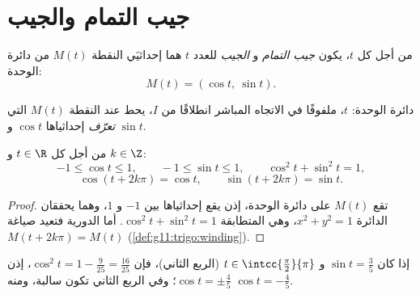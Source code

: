 \section{جيب التمام والجيب}

\begin{definition}\label{def:g11:trigo:cossin}
من أجل كل  $t$، يكون \emph{جيب التمام} و
\emph{الجيب} للعدد $t$ هما إحداثيَي النقطة $M(t)$ من
دائرة الوحدة:
\[
M(t) = (\cos t,\ \sin t).
\]
\end{definition}

\begin{omfigure}

{\small دائرة الوحدة:  $t$، ملفوفًا في الاتجاه المباشر انطلاقًا من
$I$، يحط عند النقطة $M(t)$ التي \emph{تعرّف} إحداثياها $\cos t$
و $\sin t$.}
\end{omfigure}

\begin{proposition}\label{prop:g11:trigo:first}
من أجل كل $t \in \R$ و $k \in \Z$:
\[
-1 \leq \cos t \leq 1, \qquad
-1 \leq \sin t \leq 1, \qquad
\cos^2 t + \sin^2 t = 1,
\]
\[
\cos(t + 2k\pi) = \cos t, \qquad \sin(t + 2k\pi) = \sin t .
\]
\end{proposition}

\begin{proof}
تقع $M(t)$ على دائرة الوحدة، إذن يقع إحداثياها بين $-1$ و
$1$، وهما يحققان  الدائرة $x^2 + y^2 = 1$، وهي
المتطابقة $\cos^2 t + \sin^2 t = 1$. أما الدورية فتعيد صياغة
$M(t + 2k\pi) = M(t)$ (\cref{def:g11:trigo:winding}).
\end{proof}

\begin{example}\label{ex:g11:trigo:identity}
إذا كان $\sin t = \frac35$ و $t \in \intcc{\frac\pi2}{\pi}$ (الربع
الثاني)، فإن $\cos^2 t = 1 - \frac{9}{25} = \frac{16}{25}$، إذن
$\cos t = \pm\frac45$؛ وفي الربع الثاني تكون  سالبة،
ومنه $\cos t = -\frac45$.
\end{example}

